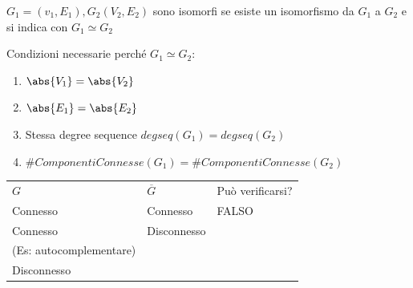 \documentclass[tikz]{article}
\providecommand{\tightlist}{%
  \setlength{\itemsep}{0pt}\setlength{\parskip}{0pt}}
\begin{document}
{{{$G_1=(v_1,E_1),G_2(V_2,E_2)$ sono isomorfi se esiste un isomorfismo da $G_1$ a $G_2$ e si indica con $G_1\simeq G_2$}

{Condizioni necessarie perché $G_1\simeq G_2$:}

\begin{enumerate}
\tightlist
\item
  $\abs{V_1}=\abs{V_2}$
\item
  $\abs{E_1}=\abs{E_2}$
\item
  {Stessa degree sequence $degseq(G_1) = degseq(G_2)$}
\item
  $\#ComponentiConnesse(G_1) = 	\#ComponentiConnesse(G_2)$
\end{enumerate}


\begin{longtable}[]{@{}lll@{}}
\toprule
\begin{minipage}[t]{0.30\columnwidth}\raggedright\strut
$G$\strut
\end{minipage} & \begin{minipage}[t]{0.30\columnwidth}\raggedright\strut
$\overline{G}$\strut
\end{minipage} & \begin{minipage}[t]{0.30\columnwidth}\raggedright\strut
{Può verificarsi?}\strut
\end{minipage}\tabularnewline
\begin{minipage}[t]{0.30\columnwidth}\raggedright\strut
{Connesso}\strut
\end{minipage} & \begin{minipage}[t]{0.30\columnwidth}\raggedright\strut
{Connesso}\strut
\end{minipage} & \begin{minipage}[t]{0.30\columnwidth}\raggedright\strut
{FALSO}\strut
\end{minipage}\tabularnewline
\begin{minipage}[t]{0.30\columnwidth}\raggedright\strut
{Connesso}\strut
\end{minipage} & \begin{minipage}[t]{0.30\columnwidth}\raggedright\strut
{Disconnesso}\strut
\end{minipage} & \begin{minipage}[t]{0.30\columnwidth}\raggedright\strut
{FALSO \\ (Es: autocomplementare)}\strut
\end{minipage}\tabularnewline
\begin{minipage}[t]{0.30\columnwidth}\raggedright\strut
{Disconnesso}\strut
\end{minipage} & \begin{minipage}[t]{0.30\columnwidth}\raggedright\strut

\end{minipage}
\end{longtable}}}
\end{document}
